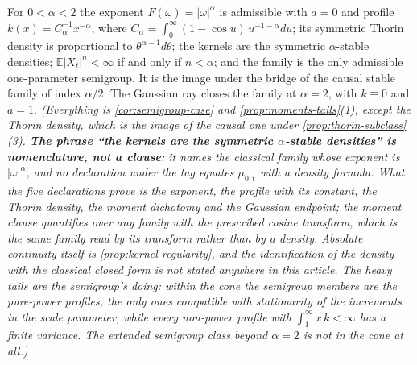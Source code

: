 \begin{proposition}\label{prop:stable-family}
\leanok
{}
For $0 < \alpha < 2$ the exponent $F(\omega) = |\omega|^\alpha$ is admissible with $a = 0$ and
profile $k(x) = C_\alpha^{-1}x^{-\alpha}$, where
$C_\alpha = \int_0^\infty (1-\cos u)\,u^{-1-\alpha}du$; its symmetric Thorin density is
proportional to $\theta^{\alpha-1}d\theta$; the kernels are the symmetric $\alpha$-stable
densities; $\mathbb{E}|X_t|^n < \infty$ if and only if $n < \alpha$; and the family is the only
admissible one-parameter semigroup. It is the image under the bridge of the causal stable family
of index $\alpha/2$. The Gaussian ray closes the family at $\alpha = 2$, with $k \equiv 0$ and
$a = 1$.
\statusT\quad\emph{(Everything is \ref{cor:semigroup-case} and \ref{prop:moments-tails}(1),
except the Thorin density, which is the image of the causal one under
\ref{prop:thorin-subclass}(3). \textbf{The phrase ``the kernels are the symmetric
$\alpha$-stable densities'' is nomenclature, not a clause}: it names the classical family whose
exponent is $|\omega|^\alpha$, and no declaration under the tag equates $\mu_{0,t}$ with a
density formula. What the five declarations prove is the exponent, the profile with its
constant, the Thorin density, the moment dichotomy and the Gaussian endpoint; the moment clause
quantifies over any family with the prescribed cosine transform, which is the same family read
by its transform rather than by a density. Absolute continuity itself is
\ref{prop:kernel-regularity}, and the identification of the density with the classical closed
form is not stated anywhere in this article. The heavy tails are the semigroup's doing: within
the cone the semigroup members are the pure-power profiles, the only ones compatible with
stationarity of the increments in the scale parameter, while every non-power profile with
$\int_1^\infty x\,k < \infty$ has a
finite variance. The extended semigroup class beyond $\alpha = 2$ is not in the cone at all.)}
\end{proposition}

